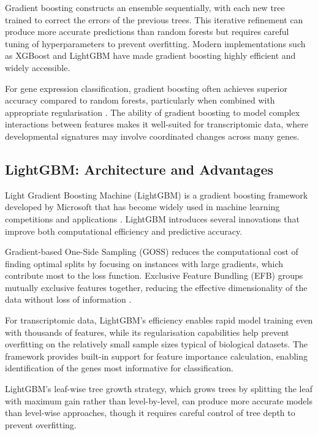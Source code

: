 Gradient boosting constructs an ensemble sequentially, with each new tree trained to correct the errors of the previous trees. This iterative refinement can produce more accurate predictions than random forests but requires careful tuning of hyperparameters to prevent overfitting. Modern implementations such as XGBoost \parencite{chen_xgboost_2016} and LightGBM have made gradient boosting highly efficient and widely accessible.

For gene expression classification, gradient boosting often achieves superior accuracy compared to random forests, particularly when combined with appropriate regularisation \parencite{ke_lightgbm_2017}. The ability of gradient boosting to model complex interactions between features makes it well-suited for transcriptomic data, where developmental signatures may involve coordinated changes across many genes.

\subsection{LightGBM: Architecture and Advantages}

Light Gradient Boosting Machine (LightGBM) is a gradient boosting framework developed by Microsoft that has become widely used in machine learning competitions and applications \parencite{ke_lightgbm_2017}. LightGBM introduces several innovations that improve both computational efficiency and predictive accuracy.

Gradient-based One-Side Sampling (GOSS) reduces the computational cost of finding optimal splits by focusing on instances with large gradients, which contribute most to the loss function. Exclusive Feature Bundling (EFB) groups mutually exclusive features together, reducing the effective dimensionality of the data without loss of information \parencite{ke_lightgbm_2017}.

For transcriptomic data, LightGBM's efficiency enables rapid model training even with thousands of features, while its regularisation capabilities help prevent overfitting on the relatively small sample sizes typical of biological datasets. The framework provides built-in support for feature importance calculation, enabling identification of the genes most informative for classification.

LightGBM's leaf-wise tree growth strategy, which grows trees by splitting the leaf with maximum gain rather than level-by-level, can produce more accurate models than level-wise approaches, though it requires careful control of tree depth to prevent overfitting.

